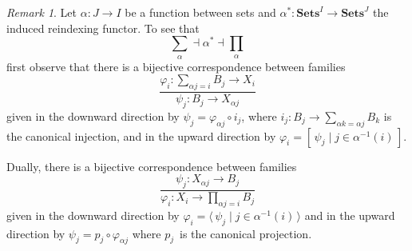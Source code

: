 \documentclass[letterpaper,12pt]{article}
\newcommand{\adj}{\dashv}
\newcommand{\adjrule}{\frac}
\newcommand{\after}{\circ}
\newcommand{\pairing}[1]{\langle#1\rangle}
\newcommand{\copairing}[1]{[#1]}
\newcommand{\inv}[1]{#1^{-1}}
\newcommand{\cat}[1]{\mathbf{#1}}
\newcommand{\2}{\cat{2}}
\newcommand{\Sets}{\cat{Sets}}
\theoremstyle{definition}
\theoremstyle{remark}
\newtheorem*{rmk}{Remark}
\theoremstyle{direction}
\begin{document}
\begin{rmk}
Let \(\alpha:J\to I\) be a function between sets and \(\alpha^*:\Sets^I\to\Sets^J\) the induced reindexing functor. To see that
\[\textstyle\sum_{\alpha}\adj\alpha^*\adj\prod_{\alpha}\]
first observe that there is a bijective correspondence between families
\[\adjrule{\varphi_i:\sum_{\alpha j=i}B_j\to X_i}{\psi_j:B_j\to X_{\alpha j}}\]
given in the downward direction by \(\psi_j=\varphi_{\alpha j}\after i_j\), where \(i_j:B_j\to\sum_{\alpha k=\alpha j}B_k\) is the canonical injection, and in the upward direction by \(\varphi_i=\copairing{\,\psi_j\mid j\in\inv{\alpha}(i)\,}\).

Dually, there is a bijective correspondence between families
\[\adjrule{\psi_j:X_{\alpha j}\to B_j}{\varphi_i:X_i\to\prod_{\alpha j=i}B_j}\]
given in the downward direction by \(\varphi_i=\pairing{\,\psi_j\mid j\in\inv{\alpha}(i)\,}\) and in the upward direction by \(\psi_j=p_j\after\varphi_{\alpha j}\) where \(p_j\)~is the canonical projection.
\end{rmk}
\end{document}
